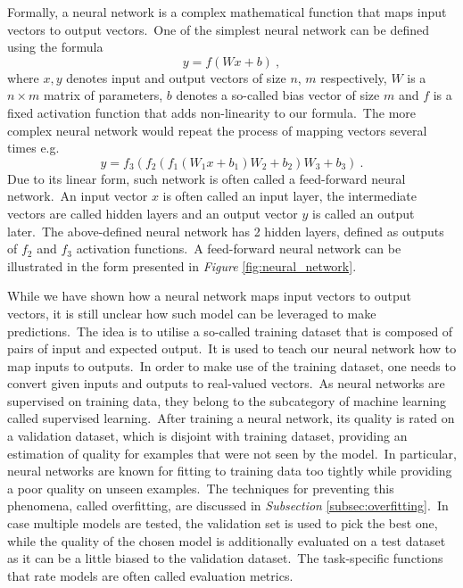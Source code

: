 \documentclass[longabstract, english, mgr]{iithesis}
\theoremstyle{default_theorem_style}\newtheorem{theorem}{Theorem}
\theoremstyle{default_theorem_style}\newtheorem{definition}{Definition}
\begin{document}
\noindent Formally, a neural network is a complex mathematical function that maps input vectors to output
vectors.\ One of the simplest neural network can be defined using the formula
\begin{equation}\label{eq:one_layer_network}
y = f(W x + b)\ ,
\end{equation}
where $x, y$ denotes input and output vectors of size $n$, $m$ respectively, $W$ is a $n \times m$ matrix of
parameters, $b$ denotes a so-called bias vector of size $m$ and $f$ is a fixed activation function that
adds non-linearity to our formula.\ The more complex neural network would repeat the process of mapping vectors several
times e.g.
\begin{equation}\label{eq:multi_layer_network}
y = f_3(f_2(f_1(W_1 x + b_1) W_2 + b_2) W_3 + b_3)\ .
\end{equation}
Due to its linear form, such network is often called a feed-forward neural network.\ An input vector $x$ is often
called an input layer, the intermediate vectors are called hidden layers and an output vector $y$ is called
an output later.\ The above-defined neural network has 2 hidden layers, defined as outputs of $f_2$ and $f_3$
activation functions.\ A feed-forward neural network can be illustrated in the form presented in
\textit{Figure} \ref{fig:neural_network}.\newline

\noindent While we have shown how a neural network maps input vectors to output vectors, it is still unclear how such
model can be leveraged to make predictions.\ The idea is to utilise a so-called training dataset that is composed of
pairs of input and expected output.\ It is used to teach our neural network how to map inputs to
outputs.\ In order to make use of the training dataset, one needs to convert given inputs and outputs
to real-valued vectors.\ As neural networks are supervised on training data, they belong to the subcategory of machine
learning called supervised learning.\ After training a neural network, its quality is rated on a validation dataset,
which is disjoint with training dataset, providing an estimation of quality for examples that were not seen by the
model.\ In particular, neural networks are known for fitting to training data too tightly while providing a poor
quality on unseen examples.\ The techniques for preventing this phenomena, called overfitting, are discussed in
\textit{Subsection} \ref{subsec:overfitting}.\ In case multiple models are tested, the validation set is used to pick
the best one, while the quality of the chosen model is additionally evaluated on a test dataset as it can be a little
biased to the validation dataset.\ The task-specific functions that rate models are often called
evaluation metrics.\newline
\end{document}
